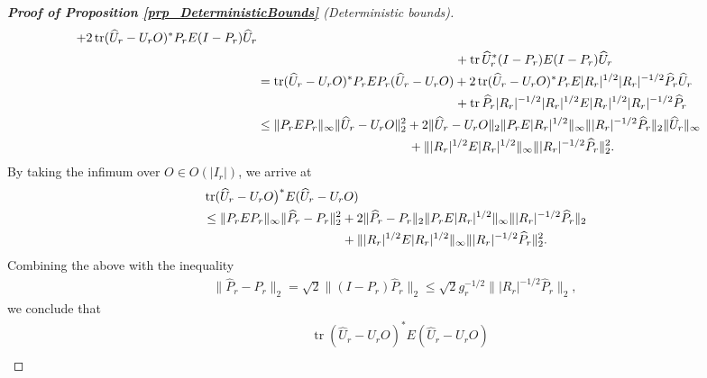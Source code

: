 \documentclass[a4paper,11pt]{article} %
\numberwithin{equation}{section}
\DeclareMathOperator*{\tr}{tr}
\theoremstyle{definition}
\theoremstyle{remark}
\theoremstyle{plain}
\begin{document}
\begin{proof}[\normalfont \textbf{Proof of Proposition \ref{prp_DeterministicBounds}} (Deterministic bounds)]
\begin{align}
      +
      2\tr (\widehat U_r - U_r O)^{*} P_r E (I - P_r) \widehat U_r
      \notag 
      \\
      \notag
      & \qquad \qquad \qquad \qquad \qquad \qquad \qquad \quad \ \  +
      \tr \widehat U_r^{*} (I - P_r) E (I - P_r) \widehat U_r
      \notag 
      \\
      & = 
      \tr (\widehat U_r - U_r O)^{*} P_r E P_r (\widehat U_r - U_r O )
      +
      2 \tr (\widehat U_r - U_r O)^{*} P_r E |R_r|^{1/2} |R_r|^{-1/2} \widehat P_r \widehat U_r
      \notag 
      \\
      & \qquad \qquad \qquad \qquad \qquad \qquad \qquad \quad \ \  +
      \tr \widehat P_r |R_r|^{-1/2} |R_r|^{1/2} E |R_r|^{1/2} |R_r|^{-1/2} \widehat P_r
      \notag 
      \\
      & \le 
      \| P_r E P_r \|_{\infty} \| \widehat U_r- U_r O \|_{2}^{2}
      +
      2\|\widehat U_r - U_r O \|_2 \| P_r E |R_r|^{1/2} \|_{\infty} \| |R_r|^{-1/2} \widehat P_r \|_2 \|\widehat U_r\|_\infty
      \notag 
      \\
      & \qquad \qquad \qquad \qquad \qquad \qquad +
      \||R_r|^{1/2}E|R_r|^{1/2}\|_{\infty}\||R_r|^{-1/2}\widehat P_r\|_2^2.
      \notag 
    \end{align}
    By taking the infimum over \( O \in O(| I_{r} |) \), we arrive at
    \begin{align}
      &
      \tr (\widehat U_r - U_r O \big)^{*} E (\widehat U_r - U_r O)
      \\
      & \le
      \| P_r E P_r \|_{\infty} \| \widehat{P}_{r} - P_{r} \|_{2}^{2} 
      +
      2\| \widehat{P}_{r} - P_{r} \|_{2} \|P_r E |R_r|^{1/2} \|_{\infty} \||R_r|^{-1/2}\widehat P_r\|_2
      \notag 
      \\
      & \qquad \qquad \qquad \qquad \qquad \ \ \ +
      \| |R_r|^{1/2} E |R_r|^{1/2} \|_{\infty} \| |R_r|^{-1/2} \widehat P_r \|_2^2.
      \notag 
    \end{align}
    Combining the above with the inequality 
    \begin{align}
     \label{eq:bound:somewhere:else:?}
         \|\widehat{P}_{r} - P_{r}\|_2 
     =
         \sqrt{2} \| (I - P_r) \widehat P_r \|_2 
    \le 
         \sqrt{2} g_r^{-1/2} \| |R_r|^{-1/2} \widehat P_r \|_2,
    \end{align}
    we conclude that
    \begin{align}  \label{eq_EigenfunctionComparison_3}
      &
      \tr (\widehat U_r- U_r O)^{*} E (\widehat U_r - U_r O)
      \\

\end{align}
\end{proof}
\end{document}
